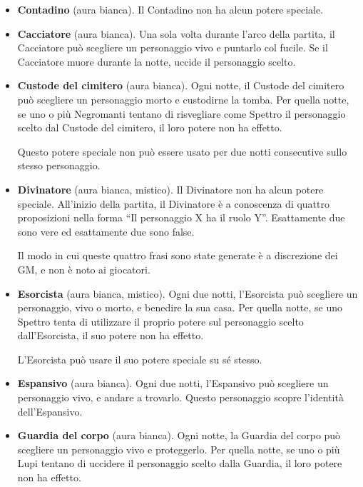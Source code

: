 \documentclass[a4paper,10pt]{article}
\begin{document}
\begin{itemize}
 \item {\bf Contadino} (aura bianca). Il Contadino non ha alcun potere speciale.

 \item {\bf Cacciatore} (aura bianca). Una sola volta durante l'arco della
partita, il Cacciatore può scegliere un personaggio vivo e puntarlo col fucile.
 Se il Cacciatore muore durante la notte, uccide il personaggio scelto.
 
 \item {\bf Custode del cimitero} (aura bianca). Ogni notte, il Custode del
cimitero può scegliere un personaggio morto e custodirne la tomba. Per quella
notte, se uno o più Negromanti tentano di risvegliare come Spettro il
personaggio scelto dal Custode del cimitero, il loro potere non ha effetto.
 
 Questo potere speciale non può essere usato per due notti consecutive sullo
stesso personaggio.

 \item {\bf Divinatore} (aura bianca, mistico). Il Divinatore non ha alcun
potere speciale. All'inizio della partita, il Divinatore è a conoscenza di
quattro proposizioni nella forma ``Il personaggio X ha il ruolo Y''. Esattamente
due sono vere ed esattamente due sono false.
 
 Il modo in cui queste quattro frasi sono state generate è a discrezione dei GM,
e non è noto ai giocatori.

 \item {\bf Esorcista} (aura bianca, mistico). Ogni due notti, l'Esorcista può
scegliere un personaggio, vivo o morto, e benedire la sua casa.
 Per quella notte, se uno Spettro tenta di utilizzare il proprio potere sul
personaggio scelto dall'Esorcista, il suo potere non ha effetto.
 
 L'Esorcista può usare il suo potere speciale su sé stesso.
 
 \item {\bf Espansivo} (aura bianca). Ogni due notti, l'Espansivo può scegliere
un personaggio vivo, e andare a trovarlo. Questo personaggio scopre l'identità
dell'Espansivo.

 \item {\bf Guardia del corpo} (aura bianca). Ogni notte, la Guardia del corpo
può scegliere un personaggio vivo e proteggerlo. Per quella notte, se uno o più
Lupi tentano di uccidere il personaggio scelto dalla Guardia, il loro potere non
ha effetto.
 

\end{itemize}
\end{document}
